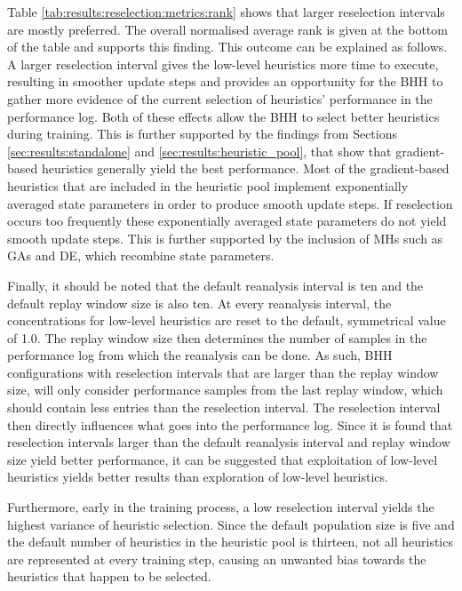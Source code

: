 Table \ref{tab:results:reselection:metrics:rank} shows that larger reselection intervals are mostly preferred. The overall normalised average rank is given at the bottom of the table and supports this finding. This outcome can be explained as follows. A larger reselection interval gives the low-level heuristics more time to execute, resulting in smoother update steps and provides an opportunity for the \acs{BHH} to gather more evidence of the current selection of heuristics' performance in the performance log. Both of these effects allow the \acs{BHH} to select better heuristics during training. This is further supported by the findings from Sections \ref{sec:results:standalone} and \ref{sec:results:heuristic_pool}, that show that gradient-based heuristics generally yield the best performance. Most of the gradient-based heuristics that are included in the heuristic pool implement exponentially averaged state parameters in order to produce smooth update steps. If reselection occurs too frequently these exponentially averaged state parameters do not yield smooth update steps. This is further supported by the inclusion of \acp{MH} such as \acp{GA} and \acs{DE}, which recombine state parameters.

Finally, it should be noted that the default reanalysis interval is ten and the default replay window size is also ten. At every reanalysis interval, the concentrations for low-level heuristics are reset to the default, symmetrical value of 1.0. The replay window size then determines the number of samples in the performance log from which the reanalysis can be done. As such, \acs{BHH} configurations with reselection intervals that are larger than the replay window size, will only consider performance samples from the last replay window, which should contain less entries than the reselection interval. The reselection interval then directly influences what goes into the performance log. Since it is found that reselection intervals larger than the default reanalysis interval and replay window size yield better performance, it can be suggested that exploitation of low-level heuristics yields better results than exploration of low-level heuristics.

Furthermore, early in the training process, a low reselection interval yields the highest variance of heuristic selection. Since the default population size is five and the default number of heuristics in the heuristic pool is thirteen, not all heuristics are represented at every training step, causing an unwanted bias towards the heuristics that happen to be             selected.


